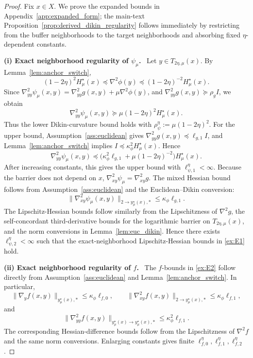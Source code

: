 \documentclass{article}
\newcommand{\proofstep}[1]{\par\smallskip\noindent\textbf{#1}\ }
\begin{document}
\begin{proof}
Fix \(x\in X\). We prove the expanded bounds in
Appendix~\ref{app:expanded_form}; the main-text Proposition~\ref{prop:derived_dikin_regularity} follows immediately by
restricting from the buffer neighborhoods to the target neighborhoods and absorbing fixed \(\eta\)-dependent constants.
\proofstep{(i) Exact neighborhood regularity of \(\psi_\mu\).}
Let \(y\in T_{2\eta,\mu}(x)\). By Lemma~\ref{lem:anchor_switch},
\[
(1-2\eta)^2H_\mu^\star(x)
\preceq
\nabla^2\phi(y)
\preceq
(1-2\eta)^{-2}H_\mu^\star(x).
\]
Since
\(\nabla_{yy}^2\psi_\mu(x,y)=\nabla_{yy}^2g(x,y)+\mu\nabla^2\phi(y)\), and
\(\nabla_{yy}^2g(x,y)\succeq \rho_g I\), we obtain
\[
\nabla_{yy}^2\psi_\mu(x,y)
\succeq
\mu(1-2\eta)^2H_\mu^\star(x).
\]
Thus the lower Dikin-curvature bound holds with
\(\rho_\psi^\eta:=\mu(1-2\eta)^2\). For the upper bound, Assumption~\ref{ass:euclidean} gives
\(\nabla_{yy}^2g(x,y)\preceq \ell_{g,1}I\), and Lemma~\ref{lem:anchor_switch}
implies \(I\preceq \kappa_\phi^2H_\mu^\star(x)\). Hence
\[
\nabla_{yy}^2\psi_\mu(x,y)
\preceq
\bigl(\kappa_\phi^2\ell_{g,1}+\mu(1-2\eta)^{-2}\bigr)H_\mu^\star(x).
\]
After increasing constants, this gives the upper bound with \(\ell_{\psi,1}^\eta<\infty\).
Because the barrier does not depend on \(x\), \(\nabla_{xy}^2\psi_\mu=\nabla_{xy}^2g\). The mixed
Hessian bound follows from Assumption~\ref{ass:euclidean} and the Euclidean--Dikin conversion:
\[
\|\nabla_{xy}^2\psi_\mu(x,y)\|_{2\to y_\mu^\star(x),*}
\le
\kappa_\phi\ell_{g,1}.
\]
The Lipschitz-Hessian bounds follow similarly from the Lipschitzness of \(\nabla^2g\), the
self-concordant third-derivative bounds for the logarithmic barrier on \(T_{2\eta,\mu}(x)\), and
the norm conversions in Lemma~\ref{lem:euc_dikin}. Hence there exists
\(\ell_{\psi,2}^\eta<\infty\) such that the exact-neighborhood Lipschitz-Hessian bounds in
\eqref{ex:E1} hold.
\proofstep{(ii) Exact neighborhood regularity of \(f\).}
The \(f\)-bounds in \eqref{ex:E2} follow directly from Assumption~\ref{ass:euclidean} and
Lemma~\ref{lem:anchor_switch}. In particular,
\[
\|\nabla_y f(x,y)\|_{y_\mu^\star(x),*}\le \kappa_\phi\ell_{f,0},
\qquad
\|\nabla_{xy}^2 f(x,y)\|_{2\to y_\mu^\star(x),*}\le \kappa_\phi\ell_{f,1},
\]
and
\[
\|\nabla_{yy}^2 f(x,y)\|_{y_\mu^\star(x)\to y_\mu^\star(x),*}
\le
\kappa_\phi^2\ell_{f,1}.
\]
The corresponding Hessian-difference bounds follow from the Lipschitzness of \(\nabla^2 f\) and
the same norm conversions. Enlarging constants gives finite
\(\ell_{f,0}^\eta,\ell_{f,1}^\eta,\ell_{f,2}^\eta\).


\end{proof}
\end{document}

